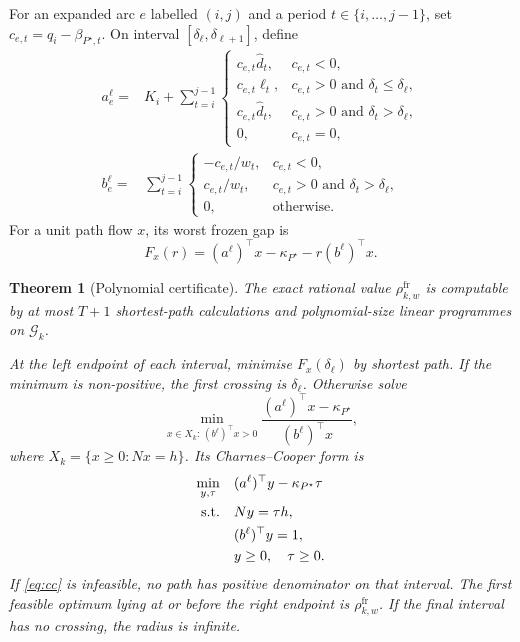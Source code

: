 \documentclass[11pt]{article}
\newtheorem{theorem}{Theorem}[section]
\theoremstyle{definition}
\newcommand{\cG}{\mathcal{G}}
\newcommand{\dhat}{\widehat d}
\newcommand{\ellv}{\ell}
\newcommand{\rhofr}{\rho^{\mathrm{fr}}}
\begin{document}
For an expanded arc $e$ labelled $(i,j)$ and a period $t\in\{i,\ldots,j-1\}$, set $c_{e,t}=q_i-\beta_{P^\star,t}$. On interval $[\delta_\ell,\delta_{\ell+1}]$, define
\begin{align}
a_e^\ell={}&K_i+\sum_{t=i}^{j-1}
\begin{cases}
c_{e,t}\dhat_t,&c_{e,t}<0,\\
c_{e,t}\ellv_t,&c_{e,t}>0\text{ and }\delta_t\le\delta_\ell,\\
c_{e,t}\dhat_t,&c_{e,t}>0\text{ and }\delta_t>\delta_\ell,\\
0,&c_{e,t}=0,
\end{cases}\label{eq:aintercept}\\
b_e^\ell={}&\sum_{t=i}^{j-1}
\begin{cases}
-c_{e,t}/w_t,&c_{e,t}<0,\\
c_{e,t}/w_t,&c_{e,t}>0\text{ and }\delta_t>\delta_\ell,\\
0,&\text{otherwise}.
\end{cases}\label{eq:bslope}
\end{align}
For a unit path flow $x$, its worst frozen gap is
\begin{equation}\label{eq:intervalgap}
F_x(r)=(a^\ell)^\top x-\kappa_{P^\star}-r(b^\ell)^\top x.
\end{equation}

\begin{theorem}[Polynomial certificate]\label{thm:polynomial}
The exact rational value $\rhofr_{k,w}$ is computable by at most $T+1$ shortest-path calculations and polynomial-size linear programmes on $\cG_k$.

At the left endpoint of each interval, minimise $F_x(\delta_\ell)$ by shortest path. If the minimum is non-positive, the first crossing is $\delta_\ell$. Otherwise solve
\begin{equation}\label{eq:fractional}
\min_{x\in X_k:\,(b^\ell)^\top x>0}
\frac{(a^\ell)^\top x-\kappa_{P^\star}}{(b^\ell)^\top x},
\end{equation}
where $X_k=\{x\ge0:Nx=h\}$. Its Charnes--Cooper form is
\begin{align}
\min_{y,\tau}\quad &(a^\ell)^\top y-\kappa_{P^\star}\tau\label{eq:cc}\\
\text{s.t.}\quad &Ny=\tau h,\notag\\
&(b^\ell)^\top y=1,\notag\\
&y\ge0,\quad\tau\ge0.\notag
\end{align}
If \eqref{eq:cc} is infeasible, no path has positive denominator on that interval. The first feasible optimum lying at or before the right endpoint is $\rhofr_{k,w}$. If the final interval has no crossing, the radius is infinite.
\end{theorem}
\end{document}
